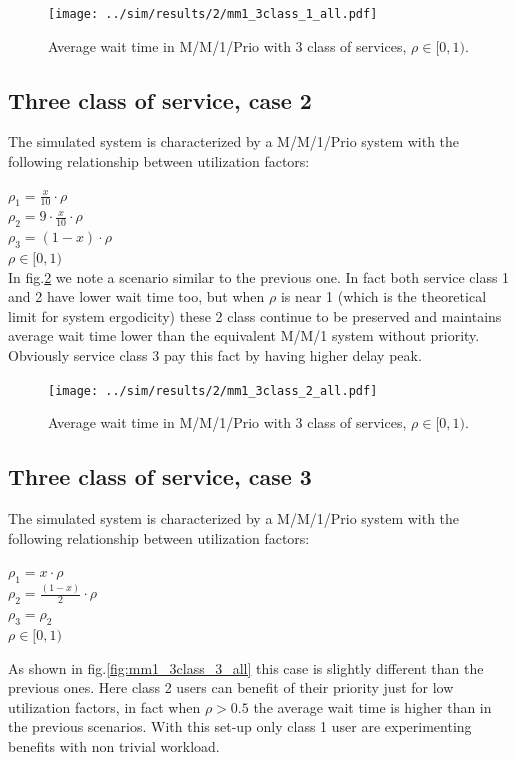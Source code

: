 \documentclass{llncs}
\newcommand{\labelsec}[1]{\label{sec:#1}}
\begin{document}
\begin{figure}
\centering
\texttt{[image: ../sim/results/2/mm1\_3class\_1\_all.pdf]}
\caption{Average wait time in M/M/1/Prio with 3 class of services, $\rho \in [0,1)$.}
\label{fig:mm1_3class_1_all}
\end{figure}
\newpage
\subsection{Three class of service, case 2}
\labelsec{MG1PRIO_3class_2}

The simulated system is characterized by a M/M/1/Prio system with the following relationship between utilization factors:

\begin{center}
$\rho_1 = \frac{x}{10} \cdot \rho $\\
$\rho_2 = 9 \cdot \frac{x}{10} \cdot \rho$\\
$\rho_3 = (1-x) \cdot \rho$\\
$\rho \in [0,1)$ \\
In fig.\ref{fig:mm1_3class_2_all} we note a scenario similar to the previous one. In fact both service class 1 and 2 have lower wait time too, but when $\rho$ is near 1 (which is the theoretical limit for system ergodicity) these 2 class continue to be preserved and maintains average wait time lower than the equivalent M/M/1 system without priority. Obviously service class 3 pay this fact by having higher delay peak.
\end{center}

\begin{figure}
\centering
\texttt{[image: ../sim/results/2/mm1\_3class\_2\_all.pdf]}
\caption{Average wait time in M/M/1/Prio with 3 class of services, $\rho \in [0,1)$.}
\label{fig:mm1_3class_2_all}
\end{figure}
\newpage
\subsection{Three class of service, case 3}
\labelsec{MG1PRIO_3class_3}

The simulated system is characterized by a M/M/1/Prio system with the following relationship between utilization factors:
\begin{center}
$\rho_1 = x \cdot \rho $ \\
$\rho_2 = \frac{(1-x)}{2} \cdot \rho$ \\  
$\rho_3 = \rho_2 $ \\
$\rho \in [0,1)  $ \\
\end{center}
As shown in fig.\ref{fig:mm1_3class_3_all} this case is slightly different than the previous ones. Here class 2 users can benefit of their priority just for low utilization factors, in fact when $\rho > 0.5$ the average wait time is higher than in the previous scenarios. With this set-up only class 1 user are experimenting benefits with non trivial workload.
\end{document}
